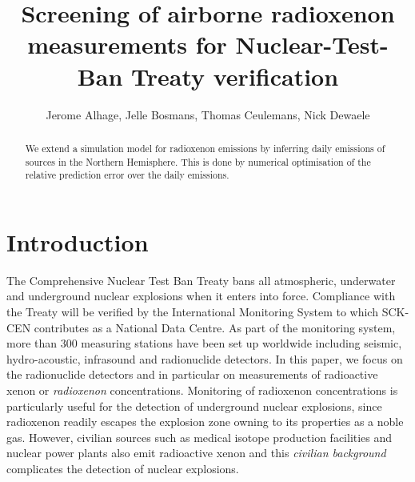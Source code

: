 \documentclass{article}
\title{Screening of airborne radioxenon measurements for Nuclear-Test-Ban Treaty verification}
\author{Jerome Alhage, Jelle Bosmans, Thomas Ceulemans, Nick Dewaele}
\date{}
\begin{document}
    \maketitle

    \begin{abstract}
        We extend a simulation model for radioxenon emissions by inferring daily emissions of sources in the Northern Hemisphere. This is done by numerical optimisation of the relative prediction error over the daily emissions.
    \end{abstract}

\section{Introduction}
The Comprehensive Nuclear Test Ban Treaty \cite{CTBT} bans all atmospheric, underwater and underground nuclear explosions when it enters into force. Compliance with the Treaty will be verified by the International Monitoring System to which SCK-CEN contributes as a National Data Centre. As part of the monitoring system, more than 300 measuring stations have been set up worldwide including seismic, hydro-acoustic, infrasound and radionuclide detectors. In this paper, we focus on the radionuclide detectors and in particular on measurements of radioactive xenon or \emph{radioxenon} concentrations. Monitoring of radioxenon concentrations is particularly useful for the detection of underground nuclear explosions, since radioxenon readily escapes the explosion zone owning to its properties as a noble gas. However, civilian sources such as medical isotope production facilities and nuclear power plants also emit radioactive xenon and this \emph{civilian background} complicates the detection of nuclear explosions.
\end{document}
